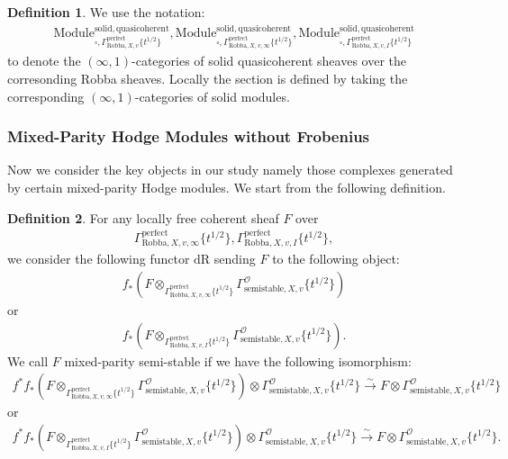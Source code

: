\documentclass[12pt]{book}
\theoremstyle{definition}
\newtheorem{definition}{Definition}
\begin{document}
\begin{definition}
We use the notation:
\begin{align}
\mathrm{Module}^\mathrm{solid,quasicoherent}_{\square,\Gamma^\mathrm{perfect}_{\text{Robba},X,v}\{t^{1/2}\}},\mathrm{Module}^\mathrm{solid,quasicoherent}_{\square,\Gamma^\mathrm{perfect}_{\text{Robba},X,v,\infty}\{t^{1/2}\}},
\mathrm{Module}^\mathrm{solid,quasicoherent}_{\square,\Gamma^\mathrm{perfect}_{\text{Robba},X,v,I}\{t^{1/2}\}} 
\end{align}
to denote the $(\infty,1)$-categories of solid quasicoherent sheaves over the corresonding Robba sheaves. Locally the section is defined by taking the corresponding $(\infty,1)$-categories of solid modules.
\end{definition}


\subsubsection{Mixed-Parity Hodge Modules without Frobenius}

\noindent Now we consider the key objects in our study namely those complexes generated by certain mixed-parity Hodge modules. We start from the following definition.

\begin{definition}
For any locally free coherent sheaf $F$ over
\begin{align}
\Gamma^\mathrm{perfect}_{\text{Robba},X,v,\infty}\{t^{1/2}\},\Gamma^\mathrm{perfect}_{\text{Robba},X,v,I}\{t^{1/2}\},
\end{align} 
we consider the following functor $\mathrm{dR}$ sending $F$ to the following object:
\begin{align}
f_*(F\otimes_{\Gamma^\mathrm{perfect}_{\text{Robba},X,v,\infty}\{t^{1/2}\}} \Gamma^\mathcal{O}_{\text{semistable},X,v}\{t^{1/2}\})
\end{align}
or 
\begin{align}
f_*(F\otimes_{\Gamma^\mathrm{perfect}_{\text{Robba},X,v,I}\{t^{1/2}\}} \Gamma^\mathcal{O}_{\text{semistable},X,v}\{t^{1/2}\}).
\end{align}
We call $F$ mixed-parity semi-stable if we have the following isomorphism:
\begin{align}
f^*f_*(F\otimes_{\Gamma^\mathrm{perfect}_{\text{Robba},X,v,\infty}\{t^{1/2}\}} \Gamma^\mathcal{O}_{\text{semistable},X,v}\{t^{1/2}\}) \otimes \Gamma^\mathcal{O}_{\text{semistable},X,v}\{t^{1/2}\} \overset{\sim}{\longrightarrow} F \otimes \Gamma^\mathcal{O}_{\text{semistable},X,v}\{t^{1/2}\} 
\end{align}
or 
\begin{align}
f^*f_*(F\otimes_{\Gamma^\mathrm{perfect}_{\text{Robba},X,v,I}\{t^{1/2}\}} \Gamma^\mathcal{O}_{\text{semistable},X,v}\{t^{1/2}\}) \otimes \Gamma^\mathcal{O}_{\text{semistable},X,v}\{t^{1/2}\} \overset{\sim}{\longrightarrow} F \otimes \Gamma^\mathcal{O}_{\text{semistable},X,v}\{t^{1/2}\}. 
\end{align}
\end{definition}
\end{document}
